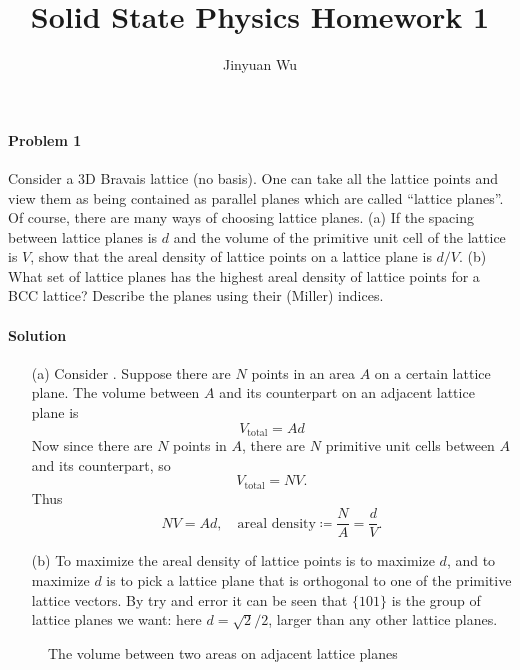 \documentclass[hyperref, a4paper]{article}
\title{Solid State Physics Homework 1}
\author{Jinyuan Wu}
\begin{document}
\maketitle

\paragraph{Problem 1} Consider a 3D Bravais lattice (no basis). One can take all the lattice points and view them as being contained as parallel planes which are called ``lattice planes''. Of course, there are many ways of choosing lattice planes.
(a) If the spacing between lattice planes is $d$ and the volume of the primitive unit cell of the lattice is $V$, show that the areal density of lattice points on a lattice plane is $d / V$.
(b) What set of lattice planes has the highest areal density of lattice points for a BCC lattice? Describe the planes using their (Miller) indices.

\paragraph{Solution} 
\begin{itemize}
\item[(a)] Consider . Suppose there are $N$ points in an area $A$
on a certain lattice plane.
The volume between $A$ and its counterpart on an adjacent lattice plane is 
\[
    V_{\text{total}} = A d
\]
Now since there are $N$ points in $A$,
there are $N$ primitive unit cells between $A$ and its counterpart, so 
\[
    V_{\text{total}} = N V.
\]
Thus 
\begin{equation}
    NV = Ad, \quad \text{areal density} \coloneqq \frac{N}{A} = \frac{d}{V}.
\end{equation}
\item[(b)] To maximize the areal density of lattice points is to maximize $d$,
and to maximize $d$ is to pick a lattice plane that is orthogonal to one of the primitive lattice vectors.
By try and error it can be seen that $\{101\}$ is the group of lattice planes we want:
here $d=\sqrt{2}/2$, larger than any other lattice planes.
\end{itemize}

\begin{figure}
    \centering
    
    \caption{The volume between two areas on adjacent lattice planes}
    \label{fig:volume-between}
\end{figure}
\end{document}

